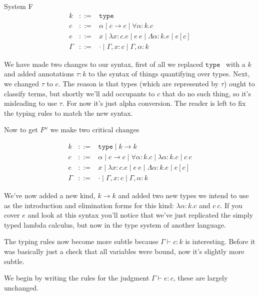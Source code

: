\documentclass{amsart}
\newcommand{\type}{\ensuremath{\mathtt{type}}}
\begin{document}
\begin{section}{System F}
\[
\begin{array}{lcl}
  k & ::= & \type\\
  c & ::= & \alpha \mid c \to c \mid \forall \alpha : k. c\\
  e & ::= & x \mid \lambda x : c. e \mid e\ e \mid
            \Lambda \alpha : k. e \mid e[c]\\
  \Gamma & ::= & \cdot \mid \Gamma, x : c \mid \Gamma, \alpha : k
\end{array}
\]

We have made two changes to our syntax, first of all we replaced \type
\, with a $k$ and added annotations $\tau : k$ to the syntax of things
quantifying over types. Next, we changed $\tau$ to $c$. The reason is
that types (which are represented by $\tau$) ought to
classify terms, but shortly we'll add occupants to $c$ that do no
such thing, so it's misleading to use $\tau$. For now it's just alpha
conversion. The reader is left to fix the typing rules to match the
new syntax.

Now to get $F^\omega$ we make two critical changes

\[
\begin{array}{lcl}
  k & ::= & \type \mid k \to k\\
  c & ::= & \alpha \mid c \to c \mid \forall \alpha : k. c
            \mid \lambda \alpha : k. c \mid c\ c\\
  e & ::= & x \mid \lambda x : c. e \mid e\ e \mid
            \Lambda \alpha : k. e \mid e[c]\\
  \Gamma & ::= & \cdot \mid \Gamma, x : c \mid \Gamma, \alpha : k
\end{array}
\]

We've now added a new kind, $k \to k$ and added two new types we
intend to use as the introduction and elimination forms for this
kind: $\lambda \alpha : k. c$ and $c\ c$. If you cover $e$ and look at
this syntax you'll notice that we've just replicated the simply typed
lambda calculus, but now in the type system of another language.

The typing rules now become more subtle because $\Gamma \vdash c : k$
is interesting. Before it was basically just a check that all
variables were bound, now it's slightly more subtle.

We begin by writing the rules for the judgment $\Gamma \vdash e : c$,
these are largely unchanged.


\end{section}
\end{document}
